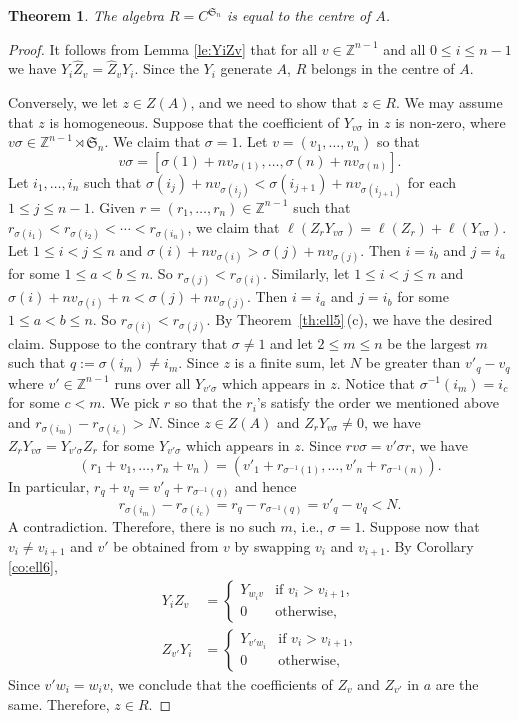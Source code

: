 \documentclass[12pt]{amsart}
\renewcommand{\le}{\leqslant}
\newcommand{\sym}[1]{\mathfrak{S}_{#1}}
\newcommand{\bZ}{{\mathbb{Z}}}
\numberwithin{equation}{section}
\newtheorem{theorem}[equation]{Theorem}
\theoremstyle{definition}
\begin{document}
\begin{theorem}\label{th:centre}
The algebra $R=C^{\sym{n}}$ is equal to the centre of $A$.
\end{theorem}
\begin{proof}
It follows from Lemma
\ref{le:YiZv} that for all $v\in \bZ^{n-1}$ and all $0 \le i \le n -1$
we have $Y_i \hat Z_v = \hat Z_vY_i$. Since the $Y_i$ generate $A$,
$R$ belongs in the centre of $A$. 

Conversely, we let $z\in Z(A)$, and we need to show that $z\in
R$. We may assume that $z$ is homogeneous. Suppose that the
coefficient of $Y_{v\sigma}$ in $z$ is non-zero, where $v\sigma\in \bZ^{n-1}\rtimes
\sym{n}$. We claim that $\sigma=1$. Let $v=(v_1,\ldots,v_n)$ so that 
\[v\sigma=[\sigma(1)+nv_{\sigma(1)},\ldots, \sigma(n)+nv_{\sigma(n)}].\] 
Let $i_1,\ldots,i_n$ such that
$\sigma(i_j)+nv_{\sigma(i_j)}<\sigma(i_{j+1})+nv_{\sigma(i_{j+1})}$
for each $1\le j\le n-1$. Given $r=(r_1,\ldots,r_n)\in \bZ^{n-1}$
such that $r_{\sigma(i_1)}<r_{\sigma(i_2)}<\cdots<r_{\sigma(i_n)}$, 
we claim that $\ell(Z_rY_{v\sigma})=\ell(Z_r)+\ell(Y_{v\sigma})$.
Let $1\le i<j\le n$ and
$\sigma(i)+nv_{\sigma(i)}>\sigma(j)+nv_{\sigma(j)}$. Then $i=i_b$ and
$j=i_a$ for some $1\le a<b\le n$. So
$r_{\sigma(j)}<r_{\sigma(i)}$. Similarly, let $1\le i<j\le n$ and
$\sigma(i)+nv_{\sigma(i)}+n<\sigma(j)+nv_{\sigma(j)}$. Then $i=i_a$
and $j=i_b$ for some $1\le a<b\le n$. So
$r_{\sigma(i)}<r_{\sigma(j)}$. By Theorem~\ref{th:ell5}\,(c), we have
the desired claim.
Suppose to the contrary that
$\sigma\neq 1$ and let $2\le m\le n$ be the largest $m$ such that 
$q:=\sigma(i_m)\neq i_m$. Since $z$ is a finite sum, let $N$ be greater
than $v'_{q}-v_{q}$ where $v'\in\bZ^{n-1}$ runs over all
$Y_{v'\sigma}$ which appears in $z$. Notice that $\sigma^{-1}(i_m)=i_c$ for some $c<m$. We pick $r$ so that the $r_i$'s satisfy the order we mentioned above and $r_{\sigma(i_m)}-r_{\sigma(i_c)}>N$. Since $z\in Z(A)$ and $Z_rY_{v\sigma}\neq 0$, we have
$Z_rY_{v\sigma}=Y_{v'\sigma}Z_r$ for some $Y_{v'\sigma}$ which appears
in $z$. Since $rv\sigma=v'\sigma r$, we
have \[(r_1+v_1,\ldots,r_n+v_n)=(v'_1+r_{\sigma^{-1}(1)},\ldots,
  v'_n+r_{\sigma^{-1}(n)}).\] In particular,
$r_q+v_q=v'_q+r_{\sigma^{-1}(q)}$ and hence  
\[r_{\sigma(i_m)}-r_{\sigma(i_c)}=r_q-r_{\sigma^{-1}(q)}= v'_q-v_q<N.\] A contradiction. Therefore, there is no such $m$, i.e., $\sigma=1$. 
Suppose now that $v_i\neq v_{i+1}$ and $v'$ be obtained from $v$ 
by swapping $v_i$ and $v_{i+1}$. By Corollary \ref{co:ell6}, \begin{align*}
Y_iZ_v&=\left \{\begin{array}{ll}Y_{w_iv}&
\text{if $v_i>v_{i+1}$,}\\ 0&\text{otherwise,}\end{array}\right .\\
Z_{v'}Y_i&=\left \{\begin{array}{ll}Y_{v'w_i}
&\text{if $v_i>v_{i+1}$,}\\ 0&\text{otherwise,}\end{array}\right .
\end{align*} Since $v'w_i=w_iv$, we conclude that the coefficients of
$Z_v$ and $Z_{v'}$ in $a$ are the same. Therefore, $z\in
R$. 
\end{proof}
\end{document}
